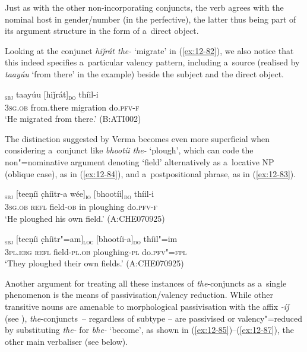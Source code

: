 Just as with the other non-incorporating conjuncts, the verb agrees with the nominal host in gender/number (in the perfective), the latter thus being part of its argument structure in the form of a~direct object. 


Looking at the conjunct \textit{hiǰrát the-} `migrate' in (\ref{ex:12-82}), we also notice that this indeed specifies a~particular valency pattern, including a~source (realised by \textit{taayúu} `from there' in the example) beside the subject and the direct object. 

\begin{exe}
\ex
\label{ex:12-82}
\gll [tíi]\textsubscript{\textsc{sbj}} taayúu [hiǰrát]\textsubscript{\textsc{do}} thíil-i  \\
\textsc{3sg.ob} from.there migration do.\textsc{pfv-f} \\
\glt `He migrated from there.' (B:ATI002)
\end{exe}

The distinction suggested by Verma becomes even more superficial when considering a~conjunct like \textit{bhootíi the-} `plough', which can code the non"=nominative argument denoting `field' alternatively as a~locative NP (oblique case), as in (\ref{ex:12-84}), and a~postpositional phrase, as in (\ref{ex:12-83}).

\begin{exe}
\ex
\label{ex:12-83}
\gll [tíi]\textsubscript{\textsc{sbj}} [teeṇíi c̣híitr-a wée]\textsubscript{\textsc{io}} [bhootíi]\textsubscript{\textsc{do}} thíil-i  \\
\textsc{3sg.ob} \textsc{refl} field-\textsc{ob} in ploughing do.\textsc{pfv-f} \\
\glt `He ploughed his own field.' (A:CHE070925)
\end{exe}
\begin{exe}
\ex
\label{ex:12-84}
\gll [taním]\textsubscript{\textsc{sbj}} [teeṇíi c̣híitr"=am]\textsubscript{\textsc{loc}} [bhootíi-a]\textsubscript{\textsc{do}} thíil"=im  \\
\textsc{3pl.erg} \textsc{refl} field-\textsc{pl.ob} ploughing-\textsc{pl} do.\textsc{pfv"=fpl} \\
\glt `They ploughed their own fields.' (A:CHE070925)
\end{exe}

Another argument for treating all these instances of \textit{the}-conjuncts as a~single phenomenon is the means of passivisation/valency reduction. While other transitive nouns are amenable to morphological passivisation with the affix \textit{-íǰ} (see ), \textit{the}-conjuncts~-- regardless of subtype -- are passivised or valency"=reduced by substituting \textit{the-} for \textit{bhe-} `become', as shown in (\ref{ex:12-85})--(\ref{ex:12-87}), the other main verbaliser (see below).

